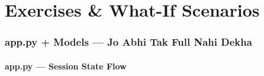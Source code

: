 \newpage

\part{Exercises \& What-If Scenarios}

\section{app.py + Models --- Jo Abhi Tak Full Nahi Dekha}

\subsection{app.py --- Session State Flow}

